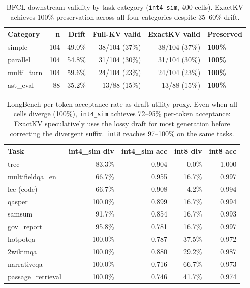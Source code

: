 \documentclass[11pt]{article}
\begin{document}
\begin{table}[htbp]
\centering\small\setlength\tabcolsep{5pt}
\renewcommand{\arraystretch}{1.05}
\begin{tabular}{lrrrrl}
\toprule
\textbf{Category} & \textbf{n} & \textbf{Drift} & \textbf{Full-KV valid} & \textbf{ExactKV valid} & \textbf{Preserved} \\
\midrule
simple      & 104 & 49.0\% & 38/104 (37\%) & 38/104 (37\%) & \textbf{100\%} \\
parallel    & 104 & 54.8\% & 31/104 (30\%) & 31/104 (30\%) & \textbf{100\%} \\
multi\_turn & 104 & 59.6\% & 24/104 (23\%) & 24/104 (23\%) & \textbf{100\%} \\
ast\_eval   &  88 & 35.2\% & 13/88  (15\%) & 13/88  (15\%) & \textbf{100\%} \\
\bottomrule
\end{tabular}
\caption{BFCL downstream validity by task category (\texttt{int4\_sim}, 400 cells).
ExactKV achieves 100\% preservation across all four categories despite 35--60\% drift.}
\label{tab:downstream-categories}
\end{table}

\begin{table}[htbp]
\centering\small\setlength\tabcolsep{4pt}
\renewcommand{\arraystretch}{1.05}
\begin{tabular}{lrrrr}
\toprule
\textbf{Task} & \textbf{int4\_sim div} & \textbf{int4\_sim acc} & \textbf{int8 div} & \textbf{int8 acc} \\
\midrule
trec              & 83.3\% & 0.904 &  0.0\% & 1.000 \\
multifieldqa\_en  & 66.7\% & 0.955 & 16.7\% & 0.997 \\
lcc (code)        & 66.7\% & 0.908 &  4.2\% & 0.994 \\
qasper            & 100.0\% & 0.899 & 16.7\% & 0.994 \\
samsum            & 91.7\% & 0.854 & 16.7\% & 0.993 \\
gov\_report       & 95.8\% & 0.781 & 16.7\% & 0.997 \\
hotpotqa          & 100.0\% & 0.787 & 37.5\% & 0.972 \\
2wikimqa          & 100.0\% & 0.880 & 29.2\% & 0.987 \\
narrativeqa       & 100.0\% & 0.716 & 66.7\% & 0.973 \\
passage\_retrieval & 100.0\% & 0.746 & 41.7\% & 0.974 \\
\bottomrule
\end{tabular}
\caption{LongBench per-token acceptance rate as draft-utility proxy. Even when all
cells diverge (100\%), \texttt{int4\_sim} achieves 72--95\% per-token acceptance:
ExactKV speculatively uses the lossy draft for most generation before correcting the
divergent suffix. \texttt{int8} reaches 97--100\% on the same tasks.}
\label{tab:longbench-acceptance}
\end{table}
\end{document}
